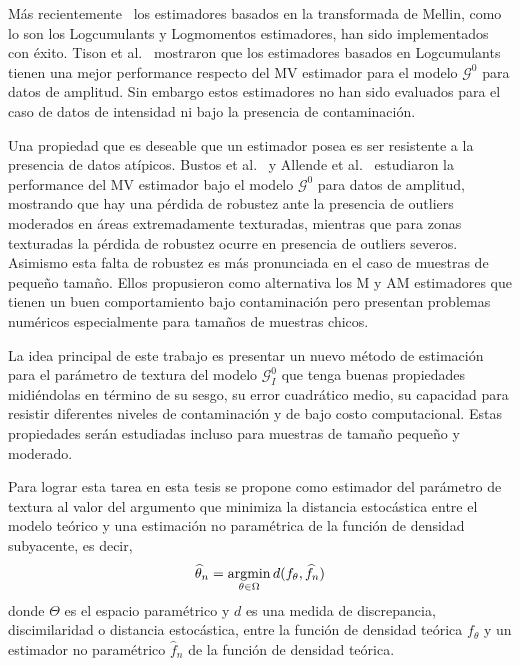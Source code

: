 Más recientemente~\cite{MellinAnalysisPolSAR,BujorTrouveValetNicolas2004,khan2014} los estimadores basados en la transformada de Mellin, como lo son los  Logcumulants y Logmomentos estimadores, han sido implementados con éxito. Tison et al.~\cite{Tison2004} mostraron que los estimadores basados en  Logcumulants tienen una mejor performance respecto del MV estimador para el modelo $\mathcal G^0$ para datos de amplitud. Sin embargo estos estimadores no han sido evaluados para el caso de datos de intensidad ni bajo la presencia de contaminación.

Una propiedad que es deseable que un estimador posea es ser resistente a la presencia de datos atípicos. Bustos et al.~\cite{BustosFreryLucini:Mestimators:2001} y Allende et al.~\cite{AllendeFreryetal:JSCS:05} estudiaron la performance del MV estimador bajo el modelo $\mathcal{G}^{0}$ para datos de amplitud, mostrando que hay una pérdida de robustez ante la presencia de outliers moderados en áreas extremadamente texturadas, mientras que para zonas texturadas la pérdida de robustez ocurre en presencia de outliers severos. Asimismo esta falta de robustez es más pronunciada en el caso de muestras de pequeño tamaño. Ellos propusieron como alternativa los M y AM estimadores que tienen un buen comportamiento bajo contaminación pero presentan problemas numéricos especialmente para tamaños de muestras chicos.

La idea principal de este trabajo es presentar un nuevo método de estimación para el parámetro de textura del modelo $\mathcal{G}_I^0$ que tenga  buenas propiedades midiéndolas en término de su sesgo, su error cuadrático medio, su capacidad para resistir diferentes niveles de contaminación y de bajo costo computacional. Estas propiedades serán estudiadas incluso para muestras de tamaño pequeño y moderado. 

Para lograr esta tarea en esta tesis se propone como estimador del parámetro de textura al valor del argumento que minimiza la distancia estocástica entre el modelo teórico y una estimación no paramétrica de la función de densidad subyacente, es decir,
\begin{align}
\label{PropuestaMDE}
\widehat{\theta}_n=\mathop{\rm argmin} \limits_{\theta\in\Omega} d(f_{\theta}, \widehat{f}_n)
\end{align}
donde $\Theta$ es el espacio paramétrico y $d$ es una medida de discrepancia, discimilaridad o distancia estocástica, entre la función de densidad teórica $f_{\theta}$ y un estimador no paramétrico $\widehat{f}_n$ de la función de densidad teórica.

